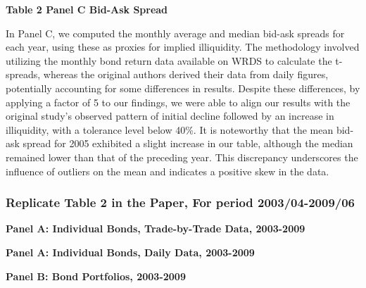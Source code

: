 \documentclass{article}
\newcommand*{\PathToOutput}{../output/}%
\begin{document}
\noindent\textbf{\small Table 2 Panel C Bid-Ask Spread}

In Panel C, we computed the monthly average and median bid-ask spreads for each year, using these as proxies for implied illiquidity. The methodology involved utilizing the monthly bond return data available on WRDS to calculate the t-spreads, whereas the original authors derived their data from daily figures, potentially accounting for some differences in results. Despite these differences, by applying a factor of 5 to our findings, we were able to align our results with the original study's observed pattern of initial decline followed by an increase in illiquidity, with a tolerance level below 40\%. It is noteworthy that the mean bid-ask spread for 2005 exhibited a slight increase in our table, although the median remained lower than that of the preceding year. This discrepancy underscores the influence of outliers on the mean and indicates a positive skew in the data.


\subsubsection{Replicate Table 2 in the Paper, For period 2003/04-2009/06}

\begin{table}[hbt!]
\centering
\textbf{\small Panel A: Individual Bonds, Trade-by-Trade Data, 2003-2009}
\small %
\renewcommand{\arraystretch}{0.92} %

\label{table:table2_panelA_trade_by_trade_paper}
\end{table}
\FloatBarrier %

\begin{table}[hbt!]
\centering
\textbf{\small Panel A: Individual Bonds, Daily Data, 2003-2009}
\small %
\renewcommand{\arraystretch}{0.92} %

\label{table:table2_panelA_daily_paper}
\end{table}
\FloatBarrier %


\begin{table}[hbt!]
\centering
\textbf{\small Panel B: Bond Portfolios, 2003-2009}
\small %
\renewcommand{\arraystretch}{0.92} %

\label{table:table2_panelB_paper}
\end{table}
\FloatBarrier %
\end{document}
